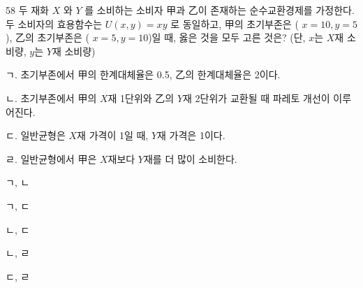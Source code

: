 \begin{question}{58}
두 재화 $X$ 와 $Y$ 를 소비하는 소비자 甲과 乙이 존재하는 순수교환경제를 가정한다. 두 소비자의 효용함수는 $U(x,y)=xy$ 로 동일하고, 甲의 초기부존은 ( $x=10,y=5$), 乙의 초기부존은 ( $x=5,y=10$)일 때, 옳은 것을 모두 고른 것은? (단, $x$는 $X$재 소비량, $y$는 $Y$재 소비량)
\begin{framedtext}
ㄱ. 초기부존에서 甲의 한계대체율은 0.5, 乙의 한계대체율은 2이다. \par
ㄴ. 초기부존에서 甲의 $X$재 1단위와 乙의 $Y$재 2단위가 교환될 때 파레토 개선이 이루어진다. \par
ㄷ. 일반균형은 $X$재 가격이 1일 때, $Y$재 가격은 1이다. \par
ㄹ. 일반균형에서 甲은 $X$재보다 $Y$재를 더 많이 소비한다. \par
\end{framedtext}
\begin{choices}
  \item ㄱ, ㄴ
  \item ㄱ, ㄷ
  \item ㄴ, ㄷ
  \item ㄴ, ㄹ
  \item ㄷ, ㄹ
\end{choices}
\end{question}
